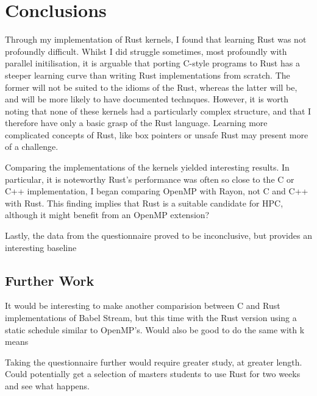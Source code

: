 \chapter{Conclusions}
Through my implementation of Rust kernels, I found that learning Rust was not profoundly difficult. Whilst I did struggle sometimes, most profoundly with parallel initilisation, it is arguable that porting C-style programs to Rust has a steeper learning curve than writing Rust implementations from scratch. The former will not be suited to the idioms of the Rust, whereas the latter will be, and will be more likely to have documented technques. However, it is  worth noting that none of these kernels had a particularly complex structure, and that I therefore have only a basic grasp of the Rust language. Learning more complicated concepts of Rust, like box pointers or unsafe Rust may present more of a challenge.

Comparing the implementations of the kernels yielded interesting results. In particular, it is noteworthy Rust's performance was often so close to the C or C++ implementation, I began comparing OpenMP with Rayon, not C and C++ with Rust. This finding implies that Rust is a suitable candidate for HPC, although it might benefit from an OpenMP extension?

Lastly, the data from the questionnaire proved to be inconclusive, but provides an interesting baseline

\section{Further Work}\label{sec:furth}
It would be interesting to make another comparision between C and Rust implementations of Babel Stream, but this time with the Rust version using a static schedule similar to OpenMP's. Would also be good to do the same with k means

Taking the questionnaire further would require greater study, at greater length. Could potentially get a selection of masters students to use Rust for two weeks and see what happens.
